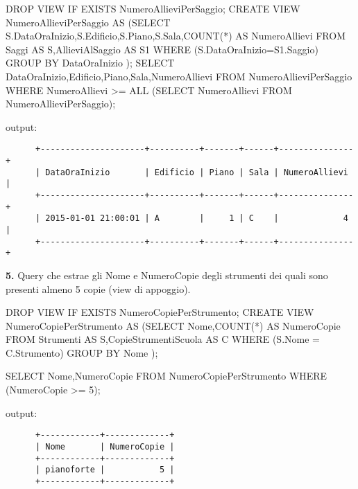 \documentclass{article}
\begin{document}
\begin{sql}[float=h]
DROP VIEW IF EXISTS NumeroAllieviPerSaggio;
CREATE VIEW NumeroAllieviPerSaggio AS (SELECT S.DataOraInizio,S.Edificio,S.Piano,S.Sala,COUNT(*) AS NumeroAllievi
						FROM Saggi AS S,AllieviAlSaggio AS S1
						WHERE (S.DataOraInizio=S1.Saggio)
						GROUP BY DataOraInizio
				      );
SELECT DataOraInizio,Edificio,Piano,Sala,NumeroAllievi
FROM NumeroAllieviPerSaggio
WHERE NumeroAllievi >= ALL (SELECT NumeroAllievi FROM NumeroAllieviPerSaggio);
\end{sql}

\begin{flushleft}
output:
\end{flushleft}

\begin{verbatim}
      +---------------------+----------+-------+------+---------------+
      | DataOraInizio       | Edificio | Piano | Sala | NumeroAllievi |
      +---------------------+----------+-------+------+---------------+
      | 2015-01-01 21:00:01 | A        |     1 | C    |             4 |
      +---------------------+----------+-------+------+---------------+
\end{verbatim}

\newpage

\begin{flushleft}
\textbf{5.} Query che estrae gli Nome e NumeroCopie degli strumenti dei quali sono presenti almeno 5 copie (view di appoggio).
\end{flushleft}

\begin{sql}[float=h]
DROP VIEW IF EXISTS NumeroCopiePerStrumento;
CREATE VIEW NumeroCopiePerStrumento AS
  (SELECT Nome,COUNT(*) AS NumeroCopie
   FROM Strumenti AS S,CopieStrumentiScuola AS C
   WHERE (S.Nome = C.Strumento)
   GROUP BY Nome
);

SELECT Nome,NumeroCopie 
FROM  NumeroCopiePerStrumento
WHERE (NumeroCopie >= 5);
\end{sql}

\begin{flushleft}
output:
\end{flushleft}

\begin{verbatim}
      +------------+-------------+
      | Nome       | NumeroCopie |
      +------------+-------------+
      | pianoforte |           5 |
      +------------+-------------+
\end{verbatim}

\bigskip
\end{document}
